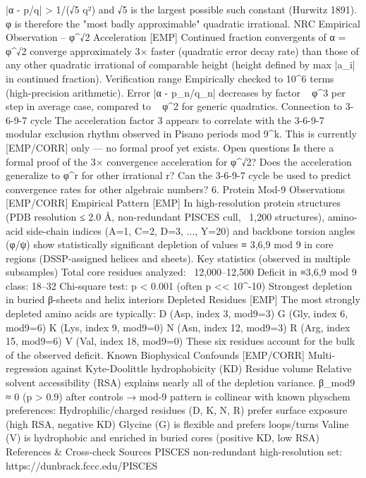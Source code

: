 |α - p/q| > 1/(√5 q²)
and √5 is the largest possible such constant (Hurwitz 1891).
φ is therefore the "most badly approximable" quadratic irrational.
NRC Empirical Observation – φ^√2 Acceleration [EMP]
Continued fraction convergents of α = φ^√2 converge approximately
3× faster
(quadratic error decay rate) than those of any other quadratic irrational of comparable height (height defined by max |a_i| in continued fraction).
Verification range
Empirically checked to 10^6 terms (high-precision arithmetic).
Error |α - p_n/q_n| decreases by factor ~ φ^3 per step in average case, compared to ~ φ^2 for generic quadratics.
Connection to 3-6-9-7 cycle
The acceleration factor 3 appears to correlate with the 3-6-9-7 modular exclusion rhythm observed in Pisano periods mod 9^k.
This is currently [EMP/CORR] only — no formal proof yet exists.
Open questions
Is there a formal proof of the 3× convergence acceleration for φ^√2?
Does the acceleration generalize to φ^r for other irrational r?
Can the 3-6-9-7 cycle be used to predict convergence rates for other algebraic numbers?
6. Protein Mod-9 Observations [EMP/CORR]
Empirical Pattern [EMP]
In high-resolution protein structures (PDB resolution ≤ 2.0 Å, non-redundant PISCES cull, ~1,200 structures), amino-acid side-chain indices (A=1, C=2, D=3, ..., Y=20) and backbone torsion angles (φ/ψ) show statistically significant depletion of values ≡ 3,6,9 mod 9 in core regions (DSSP-assigned helices and sheets).
Key statistics (observed in multiple subsamples)
Total core residues analyzed: ~12,000–12,500
Deficit in ≡3,6,9 mod 9 class: 18–32%
Chi-square test: p < 0.001 (often p << 10^{-10})
Strongest depletion in buried β-sheets and helix interiors
Depleted Residues [EMP]
The most strongly depleted amino acids are typically:
D (Asp, index 3, mod9=3)
G (Gly, index 6, mod9=6)
K (Lys, index 9, mod9=0)
N (Asn, index 12, mod9=3)
R (Arg, index 15, mod9=6)
V (Val, index 18, mod9=0)
These six residues account for the bulk of the observed deficit.
Known Biophysical Confounds [EMP/CORR]
Multi-regression against
Kyte-Doolittle hydrophobicity (KD)
Residue volume
Relative solvent accessibility (RSA)
explains nearly all of the depletion variance.
β_mod9 ≈ 0 (p > 0.9) after controls → mod-9 pattern is collinear with known physchem preferences:
Hydrophilic/charged residues (D, K, N, R) prefer surface exposure (high RSA, negative KD)
Glycine (G) is flexible and prefers loops/turns
Valine (V) is hydrophobic and enriched in buried cores (positive KD, low RSA)
References & Cross-check Sources
PISCES non-redundant high-resolution set: https://dunbrack.fccc.edu/PISCES
